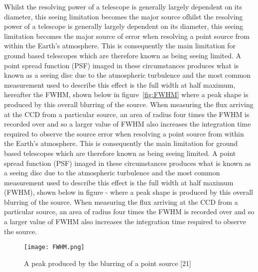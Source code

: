 \documentclass[pdf,color]{UoBnote}
\begin{document}
\noindent
Whilst the resolving power of a telescope is generally largely dependent on its diameter, this seeing limitation becomes the major source ofhilst the resolving power of a telescope is generally largely dependent on its diameter, this seeing limitation becomes the major source of error when resolving a point source from within the Earth's atmosphere. This is consequently the main limitation for ground based telescopes which are therefore known as being seeing limited. A point spread function (PSF) imaged in these circumstances produces what is known as a seeing disc due to the atmospheric turbulence and the most common measurement used to describe this effect is the full width at half maximum, hereafter the FWHM, shown below in figure~\ref{fig:FWHM} where a peak shape is produced by this overall blurring of the source. When measuring the flux arriving at the CCD from a particular source, an area of radius four times the FWHM is recorded over and so a larger value of FWHM also increases the integration time required to observe the source error when resolving a point source from within the Earth’s atmosphere. This is consequently the main limitation for ground based telescopes which are therefore known as being seeing limited. A point spread function (PSF) imaged in these circumstances produces what is known as a seeing disc due to the atmospheric turbulence and the most common measurement used to describe this effect is the full width at half maximum (FWHM), shown below in figure - where a peak shape is produced by this overall blurring of the source. When measuring the flux arriving at the CCD from a particular source, an area of radius four times the FWHM is recorded over and so a larger value of FWHM also increases the integration time required to observe the source. \\
\newline
\begin{figure}[H]
\begin{center}
\texttt{[image: FWHM.png]}
\end{center}
\caption{A peak produced by the blurring of a point source [21]}\label{fig:figure1}
\end{figure}
\noindent
\end{document}
